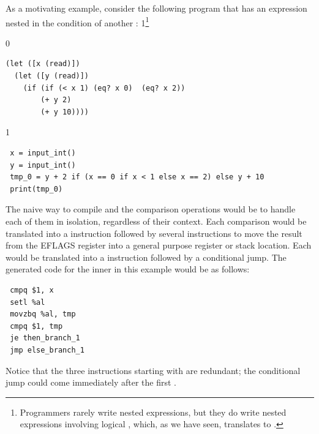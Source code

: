 \documentclass[7x10]{TimesAPriori_MIT}%
\def\racketEd{0}
\def\pythonEd{1}
\def\edition{1}
\newcommand{\pythonColor}[0]{}
\newcommand{\python}[1]{{\if\edition\pythonEd\pythonColor #1\fi}}
\numberwithin{theorem}{chapter}
\numberwithin{definition}{chapter}
\numberwithin{equation}{chapter}
\begin{document}
As a motivating example, consider the following \LangIfANF{} program that has an
 expression nested in the condition of another :%
\python{\footnote{Programmers rarely write nested 
    expressions, but they do write nested expressions involving
    logical \code{and}, which, as we have seen, translates to
    \code{if}.}}
\begin{center}
\begin{minipage}{0.96\textwidth}
{\if\edition\racketEd        
\begin{lstlisting}
(let ([x (read)])
  (let ([y (read)])
    (if (if (< x 1) (eq? x 0)  (eq? x 2))
        (+ y 2)
        (+ y 10))))
\end{lstlisting}
\fi}
{\if\edition\pythonEd\pythonColor
\begin{lstlisting}
 x = input_int()
 y = input_int()
 tmp_0 = y + 2 if (x == 0 if x < 1 else x == 2) else y + 10
 print(tmp_0)
\end{lstlisting}
\fi}
\end{minipage}
\end{center}
%
The naive way to compile  and the comparison operations would
be to handle each of them in isolation, regardless of their context.
Each comparison would be translated into a  instruction
followed by several instructions to move the result from the EFLAGS
register into a general purpose register or stack location. Each
 would be translated into a  instruction followed by
a conditional jump. The generated code for the inner  in this
example would be as follows:
\begin{center}
\begin{minipage}{0.96\textwidth}
\begin{lstlisting}
 cmpq $1, x
 setl %al
 movzbq %al, tmp
 cmpq $1, tmp
 je then_branch_1
 jmp else_branch_1
\end{lstlisting}
\end{minipage}
\end{center}
Notice that the three instructions starting with  are
redundant; the conditional jump could come immediately after the first
. 
\end{document}

